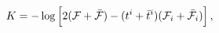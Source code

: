 \begin{equation}
K= -\log\Big[2({\cal F}+ \bar{\cal F})-
           (t^i+\bar t^i)({\cal F}_i+\bar{\cal F}_i)\Big]\,,
\label{Kspecial}
\end{equation}

